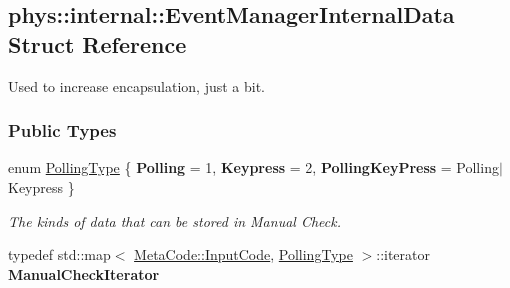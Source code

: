 \hypertarget{structphys_1_1internal_1_1EventManagerInternalData}{
\subsection{phys::internal::EventManagerInternalData Struct Reference}
\label{structphys_1_1internal_1_1EventManagerInternalData}
}


Used to increase encapsulation, just a bit.  


\subsubsection*{Public Types}
\begin{DoxyCompactItemize}
\item 
enum \hyperlink{structphys_1_1internal_1_1EventManagerInternalData_ab9ab8380b84448aacf46a63050e159af}{PollingType} \{ {\bfseries Polling} = 1, 
{\bfseries Keypress} = 2, 
{\bfseries PollingKeyPress} =  Polling$|$Keypress
 \}
\begin{DoxyCompactList}\small\item\em The kinds of data that can be stored in Manual Check. \item\end{DoxyCompactList}\item 
\hypertarget{structphys_1_1internal_1_1EventManagerInternalData_ad2b9c7924f32e299846f1d945cb82dc0}{
typedef std::map$<$ \hyperlink{classphys_1_1MetaCode_a3e501cbb5bf0f6f1fdb7211465bda8d8}{MetaCode::InputCode}, \hyperlink{structphys_1_1internal_1_1EventManagerInternalData_ab9ab8380b84448aacf46a63050e159af}{PollingType} $>$::iterator {\bfseries ManualCheckIterator}}
\label{structphys_1_1internal_1_1EventManagerInternalData_ad2b9c7924f32e299846f1d945cb82dc0}

\end{DoxyCompactItemize}
